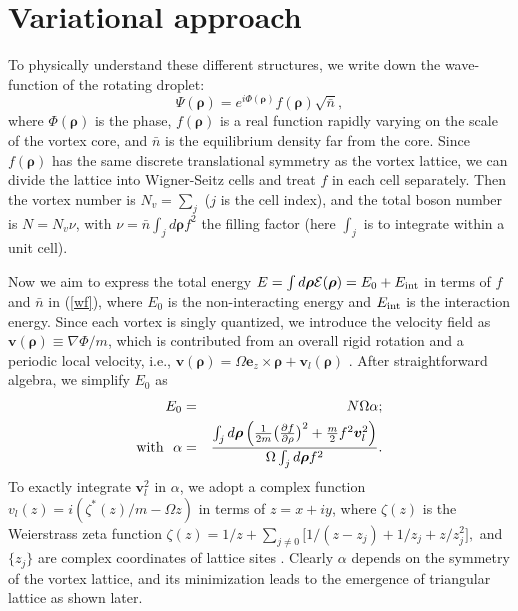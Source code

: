 \documentclass[reprint,aps,pra,twocolumn,superscriptaddress]{revtex4-1}
\begin{document}
\section{Variational approach}
To physically understand these different structures, we write down the wave-function of the rotating droplet:
\begin{equation} 
    \Psi(\bm{\rho})=e^{i \Phi(\bm{\rho})}f(\bm{\rho})\sqrt{\bar{n}}, \label{wf}
\end{equation}
where $\Phi(\bm{\rho})$ is the phase, $f(\bm{\rho})$ is a real function rapidly varying on the scale of the vortex core, and $\bar{n}$ is the equilibrium density far from the core. Since $f(\bm{\rho})$ has the same discrete translational symmetry as the vortex lattice, we can divide the lattice into Wigner-Seitz cells and treat $f$ in each cell separately. Then the vortex number is $N_v=\sum_j$ ($j$ is the cell index), and the total boson number is $N= N_v \nu$, with $\nu=\bar{n} \int_j d\bm{\rho} f^2$  the filling factor (here $\int_j$ is to integrate within a unit cell).

Now we aim to  express the total energy $E=\int d{\bm{\rho}} {\cal{E}}(\bm{\rho}) = E_0+E_{\rm int}$  in terms of $f$ and $\bar{n}$ in (\ref{wf}), where $E_0$ is the non-interacting energy and $E_{\rm int}$ is the interaction energy. Since each vortex is singly quantized, we introduce the velocity field as $\bm{v}(\bm{\rho})\equiv \nabla \Phi/m$, which is contributed from an overall rigid rotation and a periodic local velocity, i.e., $\bm{v}(\bm{\rho})=\Omega \bm{e}_z\times \bm{\rho} + \bm{v}_l(\bm{\rho})$ \cite{Tkachenko1966}. After straightforward algebra, we simplify  $E_0$ as
\begin{eqnarray}
E_0&=&N\Omega \alpha; \label{E0} \\
{\rm with} \ \    \alpha &=& \frac{ \int_j d\bm{\rho} \left( \frac{1}{2m}\big(\frac{\partial
     f}{\partial \rho}\big)^2 + \frac{m}{2} f^2 \bm{v}_l^2\right)}{ \Omega \int_j d\bm{\rho}f^2}. \nonumber
\end{eqnarray}
To exactly integrate  $\bm{v}_l^2$ in $\alpha$, we adopt a complex function $v_l(z) = i (\zeta^*(z)/m - \Omega z)$ in terms of $z=x+iy$, where $\zeta(z)$ is the Weierstrass zeta function
$
    \zeta(z) = 1/{z} + \sum_{j\ne0}\big[{1/(z-z_j)} + 1/{z_j} + {z}/{z_j^2}\big],
$
and $\{z_j\}$ are complex coordinates of lattice sites  \cite{Akhiezer1990:ElementsTheoryElliptic}. %
Clearly $\alpha$ depends on the symmetry of the vortex lattice, and its minimization  leads to the emergence of triangular lattice as shown later.
\end{document}
